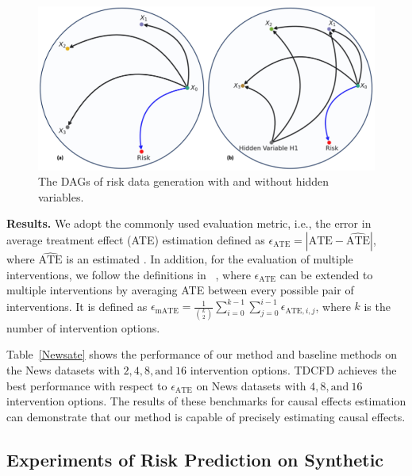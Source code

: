 \documentclass[letterpaper]{article} %
\theoremstyle{definition}
\theoremstyle{remark}
\begin{document}
\begin{figure}
  \centering
  \includegraphics[width=0.95\linewidth]{add_hidden.jpg}

  \caption{The DAGs of risk data generation with and without hidden variables.}

  \label{fig:add hidden}
\end{figure}





\noindent\textbf{Results.} We adopt the commonly used evaluation metric, i.e., the error in average treatment effect (ATE) estimation defined as $\epsilon_\text{ATE}  = |\text{ATE} - \widehat{\text{ATE}}|$, where $\widehat{\text{ATE}}$ is an estimated . In addition, for the evaluation of multiple interventions, we follow the definitions in ~\cite{schwab2018perfect}, where $\epsilon_\text{ATE}$ can be extended to multiple interventions by averaging ATE between every possible pair of interventions. It is defined as $\epsilon_\text{mATE}  = \frac{1}{\binom {k}2}\sum_{i=0}^{k-1}\sum_{j=0}^{i-1}\epsilon_{\text{ATE},i,j}$, where $k$ is the number of intervention options.


Table~\ref{Newsate} shows the performance of our method and baseline methods on the News datasets with $2, 4, 8, \text{and} \ 16$ intervention options. TDCFD achieves the best performance with respect to $\epsilon_\text{ATE}$ on News datasets with $4, 8, \text{and} \ 16$ intervention options. The results of these benchmarks for causal effects estimation can demonstrate that our method is capable of precisely estimating causal effects.


\subsection{Experiments of Risk Prediction on Synthetic}
\end{document}
